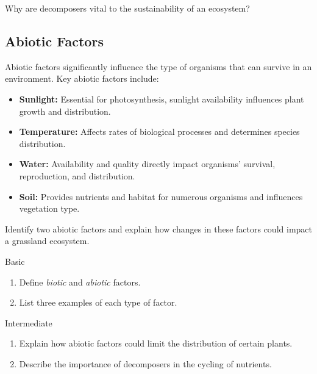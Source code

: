 
\begin{stopandthink}
Why are decomposers vital to the sustainability of an ecosystem?
\end{stopandthink}

\subsection{Abiotic Factors}

Abiotic factors significantly influence the type of organisms that can survive in an environment. Key abiotic factors include:

\begin{itemize}
    \item \textbf{Sunlight:} Essential for photosynthesis, sunlight availability influences plant growth and distribution.
    \item \textbf{Temperature:} Affects rates of biological processes and determines species distribution.
    \item \textbf{Water:} Availability and quality directly impact organisms' survival, reproduction, and distribution.
    \item \textbf{Soil:} Provides nutrients and habitat for numerous organisms and influences vegetation type.
\end{itemize}

\begin{stopandthink}
Identify two abiotic factors and explain how changes in these factors could impact a grassland ecosystem.
\end{stopandthink}

\begin{tieredquestions}{Basic}
\begin{enumerate}
    \item Define \textit{biotic} and \textit{abiotic} factors.
    \item List three examples of each type of factor.
\end{enumerate}
\end{tieredquestions}

\begin{tieredquestions}{Intermediate}
\begin{enumerate}
    \item Explain how abiotic factors could limit the distribution of certain plants.
    \item Describe the importance of decomposers in the cycling of nutrients.
\end{enumerate}
\end{tieredquestions}

